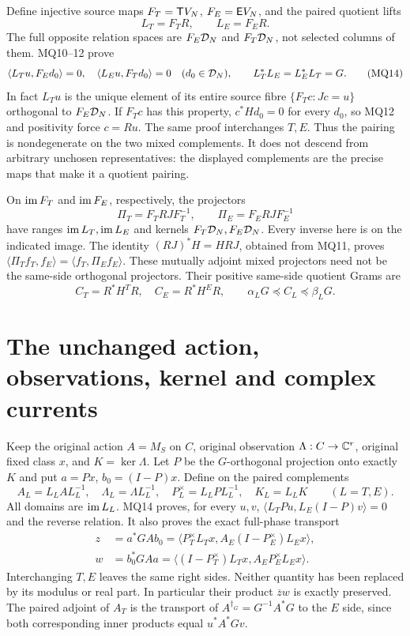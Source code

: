 Define injective source maps $F_T=\mathsf T V_N$, $F_E=\mathsf E V_N$,
and the paired quotient lifts
\[
 L_T=F_TR,\qquad L_E=F_ER.                                  \tag{MQ13}
\]
The full opposite relation spaces are $F_E\mathcal D_N$ and
$F_T\mathcal D_N$, not selected columns of them. MQ10--12 prove
\[
 \langle L_Tu,F_Ed_0\rangle=0,
 \quad \langle L_Eu,F_Td_0\rangle=0\quad(d_0\in\mathcal D_N),
 \qquad L_T^*L_E=L_E^*L_T=G.                                \tag{MQ14}
\]
In fact $L_Tu$ is the unique element of its entire source fibre
$\{F_Tc:Jc=u\}$ orthogonal to $F_E\mathcal D_N$. If $F_Tc$ has this
property, $c^*Hd_0=0$ for every $d_0$, so MQ12 and positivity
force $c=Ru$. The same proof interchanges $T,E$. Thus the pairing
is nondegenerate on the two mixed complements. It does not descend
from arbitrary unchosen representatives: the displayed complements
are the precise maps that make it a quotient pairing.

On $\operatorname{im} F_T$ and $\operatorname{im} F_E$, respectively, the projectors
\[
 \Pi_T=F_TRJ F_T^{-1},\qquad \Pi_E=F_ERJ F_E^{-1}             \tag{MQ15}
\]
have ranges $\operatorname{im} L_T,\operatorname{im} L_E$ and kernels $F_T\mathcal D_N,F_E\mathcal D_N$.
Every inverse here is on the indicated image. The identity
$(RJ)^*H=HRJ$, obtained from MQ11, proves
$\langle\Pi_T f_T,f_E\rangle=\langle f_T,\Pi_E f_E\rangle$.
These mutually adjoint mixed projectors need not be the same-side
orthogonal projectors. Their positive same-side quotient Grams are
\[
 C_T=R^*H^TR,\quad C_E=R^*H^ER,\qquad
 \alpha_L G\preceq C_L\preceq\beta_LG.                      \tag{MQ16}
\]

\section{The unchanged action, observations, kernel and complex currents}
Keep the original action $A=M_S$ on $C$, original observation
$\Lambda:C\to\mathbb C^r$, original fixed class $x$, and $K=\ker\Lambda$.
Let $P$ be the $G$-orthogonal projection onto exactly $K$ and put
$a=Px$, $b_0=(I-P)x$. Define on the paired complements
\[
 A_L=L_LAL_L^{-1},\quad \Lambda_L=\Lambda L_L^{-1},\quad
 P_L^\times=L_LPL_L^{-1},\quad K_L=L_LK\qquad(L=T,E).
                                                               \tag{MQ17}
\]
All domains are $\operatorname{im} L_L$. MQ14 proves, for every $u,v$,
$\langle L_TPu,L_E(I-P)v\rangle=0$ and the reverse relation.
It also proves the exact full-phase transport
\[
 \begin{split}
 z&=a^*GA b_0
  =\langle P_T^\times L_Tx,A_E(I-P_E^\times)L_Ex\rangle,\\
 w&=b_0^*GA a
  =\langle(I-P_T^\times)L_Tx,A_EP_E^\times L_Ex\rangle.
 \end{split}                                                  \tag{MQ18}
\]
Interchanging $T,E$ leaves the same right sides. Neither quantity
has been replaced by its modulus or real part. In particular their
product $\overline zw$ is exactly preserved. The paired adjoint of
$A_T$ is the transport of $A^{\dagger_G}=G^{-1}A^*G$ to the
$E$ side, since both corresponding inner products equal
$u^*A^*Gv$.

